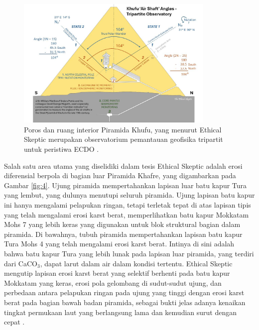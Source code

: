 \documentclass[10pt,twocolumn,letterpaper]{article}
\begin{document}
\begin{figure}[b]
\begin{center}
\includegraphics[width=0.85\textwidth]{shafts.jpg}
\end{center}
   \caption{Poros dan ruang interior Piramida Khufu, yang menurut Ethical Skeptic merupakan observatorium pemantauan geofisika tripartit untuk peristiwa ECDO \cite{28}.}
\label{fig:5}
\end{figure}

Salah satu area utama yang diselidiki dalam tesis Ethical Skeptic adalah erosi diferensial berpola di bagian luar Piramida Khafre, yang digambarkan pada Gambar \ref{fig:4}. Ujung piramida mempertahankan lapisan luar batu kapur Tura yang lembut, yang dulunya menutupi seluruh piramida. Ujung lapisan batu kapur ini hanya mengalami pelapukan ringan, tetapi terletak tepat di atas lapisan tipis yang telah mengalami erosi karst berat, memperlihatkan batu kapur Mokkatam Mohs 7 yang lebih keras yang digunakan untuk blok struktural bagian dalam piramida. Di bawahnya, tubuh piramida mempertahankan lapisan batu kapur Tura Mohs 4 yang telah mengalami erosi karst berat. Intinya di sini adalah bahwa batu kapur Tura yang lebih lunak pada lapisan luar piramida, yang terdiri dari CaCO$_3$, dapat larut dalam air dalam kondisi tertentu. Ethical Skeptic mengutip lapisan erosi karst berat yang selektif berhenti pada batu kapur Mokkatam yang keras, erosi pola gelombang di sudut-sudut ujung, dan perbedaan antara pelapukan ringan pada ujung yang tinggi dengan erosi karst berat pada bagian bawah badan piramida, sebagai bukti jelas adanya kenaikan tingkat permukaan laut yang berlangsung lama dan kemudian surut dengan cepat \cite{27}.
\end{document}
